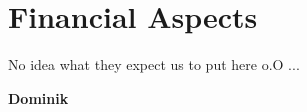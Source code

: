 \chapter{Financial Aspects}\label{chap:financial_aspects_chapter}

No idea what they expect us to put here o.O ...

\textbf{Dominik}

